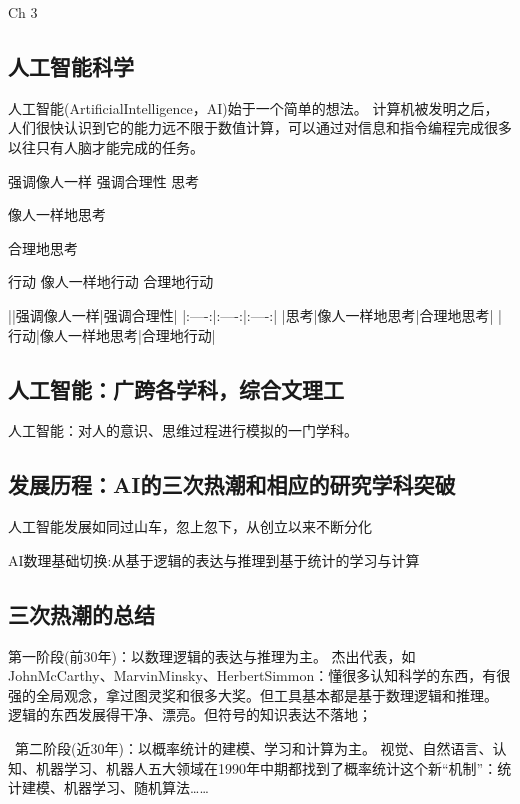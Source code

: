 Ch 3 

\subsection{人工智能科学} 

人工智能(ArtificialIntelligence，AI)始于一个简单的想法。
计算机被发明之后，人们很快认识到它的能力远不限于数值计算，可以通过对信息和指令编程完成很多以往只有人脑才能完成的任务。


强调像人一样
强调合理性
思考

像人一样地思考

合理地思考

行动
像人一样地行动
合理地行动


||强调像人一样|强调合理性|
|:----:|:----:|:----:|
|思考|像人一样地思考|合理地思考|
|行动|像人一样地思考|合理地行动|


\subsection{人工智能：广跨各学科，综合文理工}

人工智能：对人的意识、思维过程进行模拟的一门学科。

\subsection{发展历程：AI的三次热潮和相应的研究学科突破}

人工智能发展如同过山车，忽上忽下，从创立以来不断分化

AI数理基础切换:从基于逻辑的表达与推理到基于统计的学习与计算

\subsection{三次热潮的总结}

第一阶段(前30年)：以数理逻辑的表达与推理为主。
杰出代表，如JohnMcCarthy、MarvinMinsky、HerbertSimmon：懂很多认知科学的东西，有很强的全局观念，拿过图灵奖和很多大奖。但工具基本都是基于数理逻辑和推理。
逻辑的东西发展得干净、漂亮。但符号的知识表达不落地；


 第二阶段(近30年)：以概率统计的建模、学习和计算为主。
视觉、自然语言、认知、机器学习、机器人五大领域在1990年中期都找到了概率统计这个新“机制”：统计建模、机器学习、随机算法……
